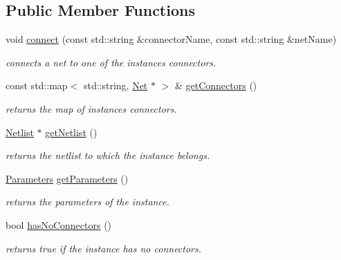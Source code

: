 \subsection*{Public Member Functions}
\begin{DoxyCompactItemize}
\item 
void \mbox{\hyperlink{class_open_chams_1_1_instance_a96b4f4ce732290340f727169d2e43ee8}{connect}} (const std\+::string \&connector\+Name, const std\+::string \&net\+Name)
\begin{DoxyCompactList}\small\item\em connects a net to one of the instance\textquotesingle{}s connectors. \end{DoxyCompactList}\item 
\mbox{\label{class_open_chams_1_1_instance_a745fe0a50eb770ce3bea36ef0e62c8ca}} 
const std\+::map$<$ std\+::string, \mbox{\hyperlink{class_open_chams_1_1_net}{Net}} $\ast$ $>$ \& \mbox{\hyperlink{class_open_chams_1_1_instance_a745fe0a50eb770ce3bea36ef0e62c8ca}{get\+Connectors}} ()
\begin{DoxyCompactList}\small\item\em returns the map of instance\textquotesingle{}s connectors. \end{DoxyCompactList}\item 
\mbox{\label{class_open_chams_1_1_instance_a4085d6a7b6958ffdd7ab5df7e6d6e53f}} 
\mbox{\hyperlink{class_open_chams_1_1_netlist}{Netlist}} $\ast$ \mbox{\hyperlink{class_open_chams_1_1_instance_a4085d6a7b6958ffdd7ab5df7e6d6e53f}{get\+Netlist}} ()
\begin{DoxyCompactList}\small\item\em returns the netlist to which the instance belongs. \end{DoxyCompactList}\item 
\mbox{\label{class_open_chams_1_1_instance_a2e51ad4344607fc279c5c8cda4edae02}} 
\mbox{\hyperlink{class_open_chams_1_1_parameters}{Parameters}} \mbox{\hyperlink{class_open_chams_1_1_instance_a2e51ad4344607fc279c5c8cda4edae02}{get\+Parameters}} ()
\begin{DoxyCompactList}\small\item\em returns the parameters of the instance. \end{DoxyCompactList}\item 
\mbox{\label{class_open_chams_1_1_instance_a44b9dfed39a5ff0c70ec99eea6ecec1a}} 
bool \mbox{\hyperlink{class_open_chams_1_1_instance_a44b9dfed39a5ff0c70ec99eea6ecec1a}{has\+No\+Connectors}} ()
\begin{DoxyCompactList}\small\item\em returns true if the instance has no connectors. \end{DoxyCompactList}\end{DoxyCompactItemize}


